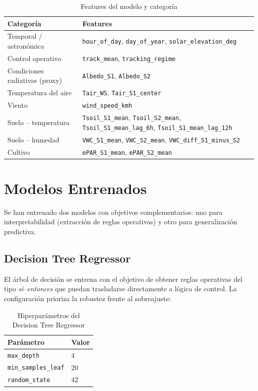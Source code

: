 \documentclass[12pt,a4paper]{article}
\begin{document}
\begin{table}[H]
\centering
\caption{Features del modelo y categoría}
\label{tab:features}
\begin{tabular}{ll}
\toprule
\textbf{Categoría} & \textbf{Features} \\
\midrule
Temporal / astronómica
    & \texttt{hour\_of\_day}, \texttt{day\_of\_year}, \texttt{solar\_elevation\_deg} \\[4pt]
Control operativo
    & \texttt{track\_mean}, \texttt{tracking\_regime} \\[4pt]
Condiciones radiativas (proxy)
    & \texttt{Albedo\_S1}, \texttt{Albedo\_S2} \\[4pt]
Temperatura del aire
    & \texttt{Tair\_WS}, \texttt{Tair\_S1\_center} \\[4pt]
Viento
    & \texttt{wind\_speed\_kmh} \\[4pt]
Suelo -- temperatura
    & \texttt{Tsoil\_S1\_mean}, \texttt{Tsoil\_S2\_mean},
      \texttt{Tsoil\_S1\_mean\_lag\_6h}, \texttt{Tsoil\_S1\_mean\_lag\_12h} \\[4pt]
Suelo -- humedad
    & \texttt{VWC\_S1\_mean}, \texttt{VWC\_S2\_mean}, \texttt{VWC\_diff\_S1\_minus\_S2} \\[4pt]
Cultivo
    & \texttt{ePAR\_S1\_mean}, \texttt{ePAR\_S2\_mean} \\
\bottomrule
\end{tabular}
\end{table}

\newpage
\section{Modelos Entrenados}

Se han entrenado dos modelos con objetivos complementarios: uno para
interpretabilidad (extracción de reglas operativas) y otro para generalización
predictiva.

\subsection{Decision Tree Regressor}

El árbol de decisión se entrena con el objetivo de obtener reglas operativas del tipo
\textit{si--entonces} que puedan trasladarse directamente a lógica de control. La
configuración prioriza la robustez frente al sobreajuste:

\begin{table}[H]
\centering
\caption{Hiperparámetros del Decision Tree Regressor}
\begin{tabular}{ll}
\toprule
\textbf{Parámetro} & \textbf{Valor} \\
\midrule
\texttt{max\_depth}        & 4 \\
\texttt{min\_samples\_leaf} & 20 \\
\texttt{random\_state}     & 42 \\
\bottomrule
\end{tabular}
\end{table}
\end{document}
